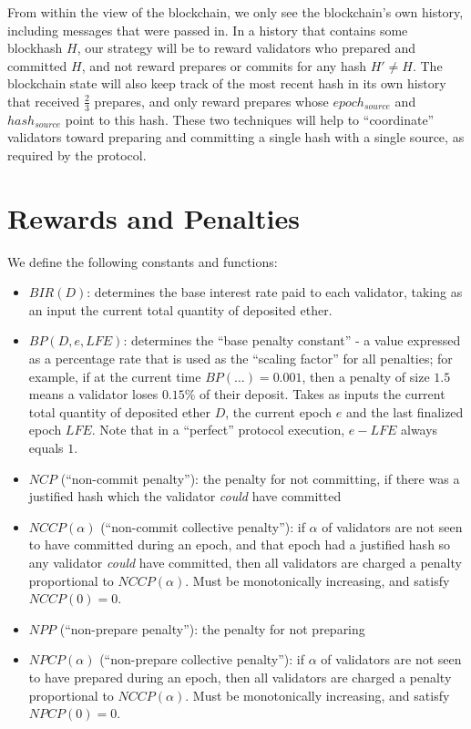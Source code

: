 \documentclass[12pt]{article}
\begin{document}
From within the view of the blockchain, we only see the blockchain's own history, including messages that were passed in. In a history that contains some blockhash $H$, our strategy will be to reward validators who prepared and committed $H$, and not reward prepares or commits for any hash $H\prime \ne H$. The blockchain state will also keep track of the most recent hash in its own history that received $\frac{2}{3}$ prepares, and only reward prepares whose $epoch_{source}$ and $hash_{source}$ point to this hash. These two techniques will help to ``coordinate'' validators toward preparing and committing a single hash with a single source, as required by the protocol.

\section{Rewards and Penalties}

We define the following constants and functions:

\begin{itemize}
\item $BIR(D)$: determines the base interest rate paid to each validator, taking as an input the current total quantity of deposited ether.
\item $BP(D, e, LFE)$: determines the ``base penalty constant'' - a value expressed as a percentage rate that is used as the ``scaling factor'' for all penalties; for example, if at the current time $BP(...) = 0.001$, then a penalty of size $1.5$ means a validator loses $0.15\%$ of their deposit. Takes as inputs the current total quantity of deposited ether $D$, the current epoch $e$ and the last finalized epoch $LFE$. Note that in a ``perfect'' protocol execution, $e - LFE$ always equals $1$.
\item $NCP$ (``non-commit penalty''): the penalty for not committing, if there was a justified hash which the validator \textit{could} have committed
\item $NCCP(\alpha)$ (``non-commit collective penalty''): if $\alpha$ of validators are not seen to have committed during an epoch, and that epoch had a justified hash so any validator \textit{could} have committed, then all validators are charged a penalty proportional to $NCCP(\alpha)$. Must be monotonically increasing, and satisfy $NCCP(0) = 0$.
\item $NPP$ (``non-prepare penalty''): the penalty for not preparing
\item $NPCP(\alpha)$ (``non-prepare collective penalty''): if $\alpha$ of validators are not seen to have prepared during an epoch, then all validators are charged a penalty proportional to $NCCP(\alpha)$. Must be monotonically increasing, and satisfy $NPCP(0) = 0$.
\end{itemize}
\end{document}
